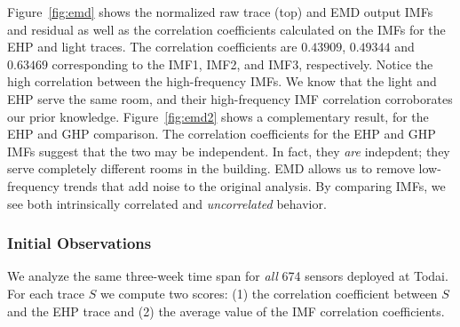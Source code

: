 Figure~\ref{fig:emd} shows the normalized raw trace (top) and EMD output IMFs and residual as well as the 
correlation coefficients calculated on the IMFs for the EHP and
light traces.  The correlation coefficients are $0.43909$, $0.49344$ and $0.63469$ corresponding to the IMF1, 
IMF2, and IMF3, respectively.  Notice the high correlation between the high-frequency IMFs.
We know that the light and EHP serve the same room, and their high-frequency IMF correlation corroborates
our prior knowledge.
Figure~\ref{fig:emd2} shows a complementary result, for the EHP and GHP comparison.
The correlation coefficients for the EHP and GHP IMFs suggest that the two may be independent.  In fact, they
\emph{are} indepdent; they serve completely different rooms in the building.
EMD allows us to remove low-frequency trends that add noise to the original analysis.
By comparing IMFs, we see both intrinsically correlated and \emph{uncorrelated} behavior.  







\subsubsection{Initial Observations}
We analyze the same three-week time span for \emph{all} 674 sensors deployed at Todai.
For each trace $S$ we compute two scores: (1) the correlation coefficient between $S$ and the EHP trace
and (2) the average value of the IMF correlation coefficients.

